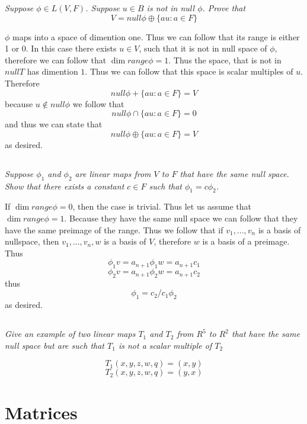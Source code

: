 \documentclass[11pt,oneside,titlepage]{book}
\begin{document}
\textit{Suppose $\phi \in L(V, F)$. Suppose $u \in B$ is not in null $\phi$. Prove that}
$$V = null \phi \oplus \{au: a \in F\}$$

$\phi$ maps into a space of dimention one. Thus we can follow that its range is either
1 or 0. In this case there exists $u \in V$, such that it is not in null space of $\phi$,
therefore we can follow that $\dim range \phi = 1$. Thus the space, that is not in $null T$
has dimention $1$. Thus we can follow that this space is scalar multiples of $u$. Therefore
$$null \phi + \{au: a \in F\} = V$$
because $u \notin null \phi$ we follow that 
$$null \phi \cap \{au: a \in F\} = 0$$
and thus we can state that
$$null \phi \oplus \{au: a \in F\} = V$$
as desired.

\subsection{}

\textit{Suppose $\phi_1$ and $\phi_2$ are linear maps from $V$ to $F$ that have the same
  null space. Show that there exists a constant $c \in F$ such that $\phi_1 = c \phi_2$.}

If $\dim range \phi = 0$, then the case is trivial. Thus let us assume that $\dim range \phi = 1$.
Because they have the same null space we can follow that they have the same preimage of
the range. Thus we follow that if $v_1, ..., v_n$ is a basis of nullspace, then
$v_1, ..., v_n, w$ is a basis of $V$, therefore $w$ is a basis of a preimage. Thus
$$\phi_1 v = a_{n + 1}  \phi_1 w = a_{n + 1}c_1 $$
$$\phi_2 v = a_{n + 1}  \phi_2 w = a_{n + 1}c_2 $$
thus
$$\phi_1 = c_2 / c_1 \phi_2$$
as desired.

\subsection{}

\textit{Give an example of two linear maps $T_1$ and $T_2$ from $R^5$ to $R^2$ that have the same
  null space but are such that $T_1$ is not a scalar multiple of $T_2$}

$$T_1(x, y, z, w, q) = (x, y)$$
$$T_2(x, y, z, w, q) = (y, x)$$

\section{Matrices}

\subsection{}
\end{document}
